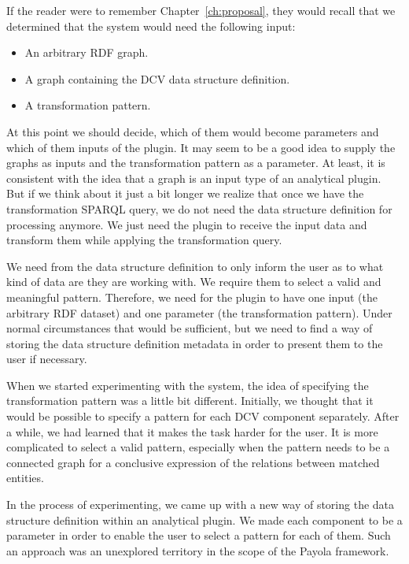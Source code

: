 If the reader were to remember Chapter~\ref{ch:proposal}, they would recall that we determined that 
the system would need the following input:
\begin{itemize}
  \item An arbitrary RDF graph.
  \item A graph containing the DCV data structure definition.
  \item A transformation pattern.
\end{itemize}

At this point we should decide, which of them would become parameters and which of 
them inputs of the plugin. It may seem to be a good idea to supply the 
graphs as inputs and the transformation pattern as a parameter. At least, it is 
consistent with the idea that a graph is an input type of an analytical plugin. 
But if we think about it just a bit longer we realize that once we have the 
transformation SPARQL query, we do not need the data structure definition for 
processing anymore. We just need the plugin to receive the input data and transform 
them while applying the transformation query.

We need from the data structure definition to only inform the user as to what kind of data are they 
are working 
with. We require them to select a valid and meaningful pattern. 
Therefore, we need for the plugin to have one input (the arbitrary RDF dataset) and 
one parameter (the transformation pattern). Under normal circumstances
that would be sufficient, but we 
need to find a way of storing the data structure definition metadata in order 
to present them to the user if necessary.

When we started experimenting with the system, the idea of specifying the 
transformation pattern was a little bit different. Initially, we thought that it 
would be possible to specify a pattern for each DCV component separately. After 
a while, we had learned that it makes the task harder for the user. It is more complicated to select a 
valid pattern, especially when the pattern needs to be a connected graph for a conclusive expression
of the relations between matched entities.

In the process of experimenting, we came up with a new way of storing the 
data structure definition within an analytical plugin. We made each component to 
be a parameter in order to enable the user to select a pattern for each of 
them. Such an approach was an unexplored territory in the scope of the Payola framework.

